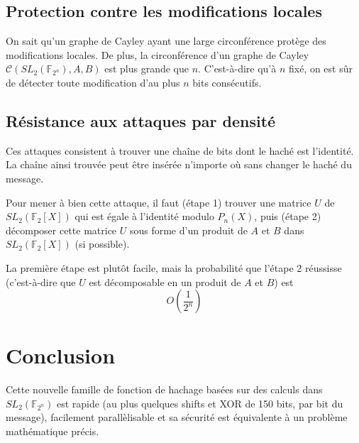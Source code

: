 \documentclass[a4paper,10pt]{article}
\theoremstyle{break}
\newcommand{\C}{\mathcal{C}}
\newcommand{\F}{\mathbb{F}}
\begin{document}
\begin{multicols}{2}
\subsection{Protection contre les modifications locales}
On sait qu'un graphe de Cayley ayant une large circonférence protège des modifications
locales. De plus, la circonférence d'un graphe de Cayley $\C(SL_2(\F_{2^n}), A, B)$ est 
plus grande que $n$. C'est-à-dire qu'à $n$ fixé, on est sûr de détecter toute modification
d'au plus $n$ bits consécutifs.

\subsection{Résistance aux attaques par densité}
Ces attaques consistent à trouver une chaîne de bits dont le haché est l'identité. La chaîne
ainsi trouvée peut être insérée n'importe où sans changer le haché du message.

Pour mener à bien cette attaque, il faut (étape 1) trouver une matrice $U$ de $SL_2(\F_2[X])$ 
qui est égale à l'identité modulo $P_n(X)$, puis (étape 2) décomposer cette matrice $U$ sous 
forme d'un produit de $A$ et $B$ dans $SL_2(\F_2[X])$ (si possible).

La première étape est plutôt facile, mais la probabilité que l'étape 2 réussisse (c'est-à-dire
que $U$ est décomposable en un produit de $A$ et $B$) est $$O\left(\frac{1}{2^n}\right)$$

\section{Conclusion}
Cette nouvelle famille de fonction de hachage basées sur des calculs dans $SL_2(\F_{2^n})$ 
est rapide (au plus quelques shifts et XOR de 150 bits, 
par bit du message), facilement parallèlisable et sa sécurité est équivalente à un 
problème mathématique précis. 


\end{multicols}
\end{document}
